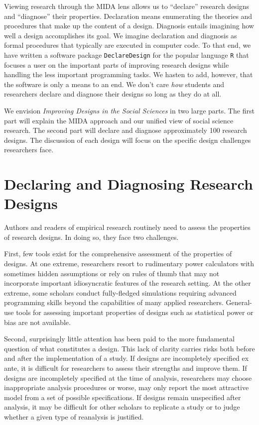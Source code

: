 \documentclass[11pt]{article}
\begin{document}
Viewing research through the MIDA lens allows us to ``declare'' research designs and ``diagnose'' their properties. Declaration means enumerating the theories and procedures that make up the content of a design. Diagnosis entails imagining how well a design accomplishes its goal. We imagine declaration and diagnosis as formal procedures that typically are executed in computer code. To that end, we have written a software package \texttt{DeclareDesign} for the popular language \texttt{R} that focuses a user on the important parts of improving research designs while handling the less important programming tasks. We hasten to add, however, that the software is only a means to an end. We don't care \textit{how} students and researchers declare and diagnose their designs so long as they do at all.

We envision \textit{Improving Designs in the Social Sciences} in two large parts. The first part will explain the MIDA approach and our unified view of social science research. The second part will declare and diagnose approximately 100 research designs. The discussion of each design will focus on the specific design challenges researchers face.

\section{Declaring and Diagnosing Research Designs}

\noindent Authors and readers of empirical research routinely need to assess the properties of research designs. In doing so, they face two challenges.  

First, few tools exist for the comprehensive assessment of the properties of designs. At one extreme, researchers resort to rudimentary power calculators with sometimes hidden assumptions or rely on rules of thumb that may not incorporate important idiosyncratic features of the research setting. At the other extreme, some scholars conduct fully-fledged simulations requiring advanced programming skills beyond the capabilities of many applied researchers. General-use tools for assessing important properties of designs such as statistical power or bias are not available.

Second, surprisingly little attention has been paid to the more fundamental question of what constitutes a design. This lack of clarity carries risks both before and after the implementation of a study. If designs are incompletely specified ex ante, it is difficult for researchers to assess their strengths and improve them. If designs are incompletely specified at the time of analysis, researchers may choose inappropriate analysis procedures or worse, may only report the most attractive model from a set of possible specifications. If designs remain unspecified after analysis, it may be difficult for other scholars to replicate a study or to judge whether a given type of reanalysis is justified. 
\end{document}

